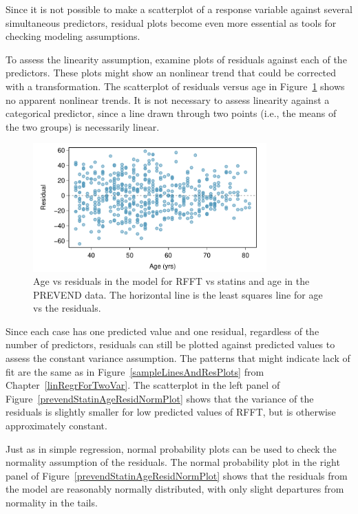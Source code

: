Since it is not possible to make a scatterplot of a response variable against several simultaneous predictors, residual plots become even more essential as tools for checking modeling assumptions. 

To assess the linearity assumption, examine plots of residuals against each of the predictors. These plots might show an nonlinear trend that could be corrected with a transformation. The scatterplot of residuals versus age in Figure~\ref{prevendStatinAgeResidPlot} shows no apparent nonlinear trends. It is not necessary to assess linearity against a categorical predictor, since a line drawn through two points (i.e., the means of the two groups) is necessarily linear.

\begin{figure}[h!]
	\centering
	\includegraphics[width=0.8\textwidth]
	{ch_multiple_linear_regression_oi_biostat/figures/prevendStatinAgeResidPlot/prevendStatinAgeResidPlot.pdf}
	\caption{Age vs residuals in the model for RFFT vs statins and age in the PREVEND data.  The horizontal line is the least squares line for age vs the residuals.}
	\label{prevendStatinAgeResidPlot}
\end{figure}

Since each case has one predicted value and one residual, regardless of the number of predictors, residuals can still be plotted against predicted values to assess the constant variance assumption. The patterns that might indicate lack of fit are the same as in Figure~\ref{sampleLinesAndResPlots} from Chapter~\ref{linRegrForTwoVar}. The scatterplot in the left panel of Figure~\ref{prevendStatinAgeResidNormPlot} shows that the variance of the residuals is slightly smaller for low predicted values of RFFT, but is otherwise approximately constant.

Just as in simple regression, normal probability plots can be used to check the normality assumption of the residuals. The normal probability plot in the right panel of Figure~\ref{prevendStatinAgeResidNormPlot} shows that the residuals from the model are reasonably normally distributed, with only slight departures from normality in the tails.

